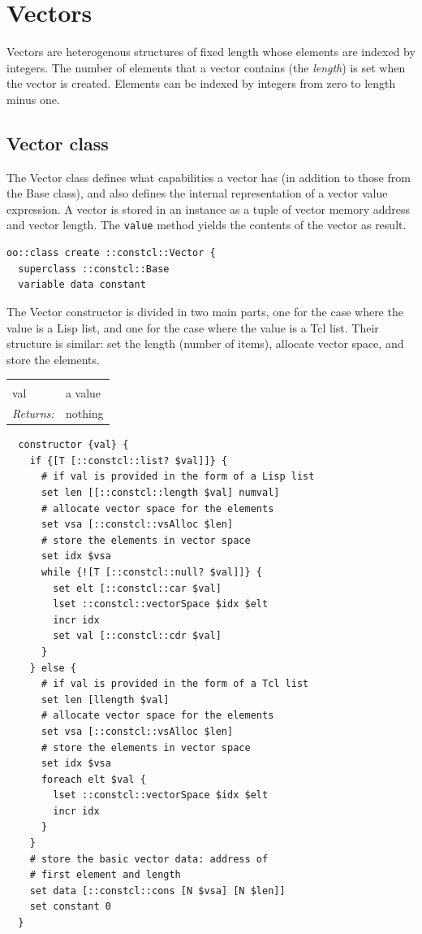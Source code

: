 \documentclass[a5paper,draft]{memoir}
\begin{document}
\section{Vectors}
\label{vectors}

Vectors are heterogenous structures of fixed length whose elements are indexed by integers. The number of elements that a vector contains (the \emph{length}) is set when the vector is created. Elements can be indexed by integers from zero to length minus one.

\subsection{Vector class}
\label{vector-class}

The Vector class defines what capabilities a vector has (in addition to those from the Base class), and also defines the internal representation of a vector value expression. A vector is stored in an instance as a tuple of vector memory address and vector length. The \texttt{value} method yields the contents of the vector as result.

\begin{lstlisting}
oo::class create ::constcl::Vector {
  superclass ::constcl::Base
  variable data constant
\end{lstlisting}

The Vector constructor is divided in two main parts, one for the case where the value is a Lisp list, and one for the case where the value is a Tcl list. Their structure is similar: set the length (number of items), allocate vector space, and store the elements.

\noindent\begin{tabular}{ |p{1.9cm} p{6.5cm}| }
\hline
\rowcolor[HTML]{CCCCCC} \multicolumn{2}{|l|}{\textbf{Vector constructor (internal)}} \\
val & a value \\
\textit{Returns:} & nothing \\
\hline
\end{tabular}

\begin{lstlisting}
  constructor {val} {
    if {[T [::constcl::list? $val]]} {
      # if val is provided in the form of a Lisp list
      set len [[::constcl::length $val] numval]
      # allocate vector space for the elements
      set vsa [::constcl::vsAlloc $len]
      # store the elements in vector space
      set idx $vsa
      while {![T [::constcl::null? $val]]} {
        set elt [::constcl::car $val]
        lset ::constcl::vectorSpace $idx $elt
        incr idx
        set val [::constcl::cdr $val]
      }
    } else {
      # if val is provided in the form of a Tcl list
      set len [llength $val]
      # allocate vector space for the elements
      set vsa [::constcl::vsAlloc $len]
      # store the elements in vector space
      set idx $vsa
      foreach elt $val {
        lset ::constcl::vectorSpace $idx $elt
        incr idx
      }
    }
    # store the basic vector data: address of
    # first element and length
    set data [::constcl::cons [N $vsa] [N $len]]
    set constant 0
  }
\end{lstlisting}
\end{document}
